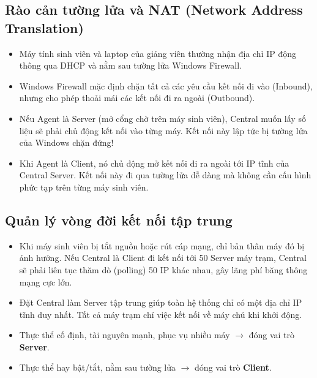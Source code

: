 \documentclass[12pt,a4paper]{article}
\begin{document}
\subsection{Rào cản tường lửa và NAT (Network Address Translation)}
\begin{itemize}
  \item Máy tính sinh viên và laptop của giảng viên thường nhận địa chỉ IP động thông qua DHCP và nằm sau tường lửa Windows Firewall.
  \item Windows Firewall mặc định chặn tất cả các yêu cầu kết nối đi vào (Inbound), nhưng cho phép thoải mái các kết nối đi ra ngoài (Outbound).
  \item Nếu Agent là Server (mở cổng chờ trên máy sinh viên), Central muốn lấy số liệu sẽ phải chủ động kết nối vào từng máy. Kết nối này lập tức bị tường lửa của Windows chặn đứng!
  \item Khi Agent là Client, nó chủ động mở kết nối đi ra ngoài tới IP tĩnh của Central Server. Kết nối này đi qua tường lửa dễ dàng mà không cần cấu hình phức tạp trên từng máy sinh viên.
\end{itemize}

\subsection{Quản lý vòng đời kết nối tập trung}
\begin{itemize}
  \item Khi máy sinh viên bị tắt nguồn hoặc rút cáp mạng, chỉ bản thân máy đó bị ảnh hưởng. Nếu Central là Client đi kết nối tới 50 Server máy trạm, Central sẽ phải liên tục thăm dò (polling) 50 IP khác nhau, gây lãng phí băng thông mạng cực lớn.
  \item Đặt Central làm Server tập trung giúp toàn hệ thống chỉ có một địa chỉ IP tĩnh duy nhất. Tất cả máy trạm chỉ việc kết nối về máy chủ khi khởi động.
\end{itemize}

\begin{takeawaybox}
\begin{itemize}[leftmargin=1.5em, itemsep=1pt]
  \item Thực thể cố định, tài nguyên mạnh, phục vụ nhiều máy $\rightarrow$ đóng vai trò \textbf{Server}.
  \item Thực thể hay bật/tắt, nằm sau tường lửa $\rightarrow$ đóng vai trò \textbf{Client}.
\end{itemize}
\end{takeawaybox}
\end{document}
